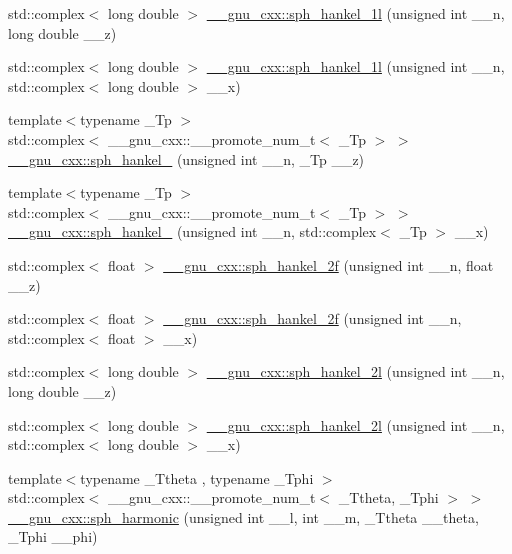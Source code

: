 \begin{DoxyCompactItemize}
\item 
std\+::complex$<$ long double $>$ \hyperlink{group__gnu__math__spec__func_ga6e77fd5cddfbd57d9120b20fc6c30e6f}{\+\_\+\+\_\+gnu\+\_\+cxx\+::sph\+\_\+hankel\+\_\+1l} (unsigned int \+\_\+\+\_\+n, long double \+\_\+\+\_\+z)
\item 
std\+::complex$<$ long double $>$ \hyperlink{group__gnu__math__spec__func_ga3e9d889d8f2e4792e892b12b1f5948b9}{\+\_\+\+\_\+gnu\+\_\+cxx\+::sph\+\_\+hankel\+\_\+1l} (unsigned int \+\_\+\+\_\+n, std\+::complex$<$ long double $>$ \+\_\+\+\_\+x)
\item 
{\footnotesize template$<$typename \+\_\+\+Tp $>$ }\\std\+::complex$<$ \+\_\+\+\_\+gnu\+\_\+cxx\+::\+\_\+\+\_\+promote\+\_\+num\+\_\+t$<$ \+\_\+\+Tp $>$ $>$ \hyperlink{group__gnu__math__spec__func_ga4f112ebd12bfbea7f0eea9275a1209ac}{\+\_\+\+\_\+gnu\+\_\+cxx\+::sph\+\_\+hankel\+\_} (unsigned int \+\_\+\+\_\+n, \+\_\+\+Tp \+\_\+\+\_\+z)
\item 
{\footnotesize template$<$typename \+\_\+\+Tp $>$ }\\std\+::complex$<$ \+\_\+\+\_\+gnu\+\_\+cxx\+::\+\_\+\+\_\+promote\+\_\+num\+\_\+t$<$ \+\_\+\+Tp $>$ $>$ \hyperlink{group__gnu__math__spec__func_ga54a1b7896a7218bfe0fb7f422af62122}{\+\_\+\+\_\+gnu\+\_\+cxx\+::sph\+\_\+hankel\+\_} (unsigned int \+\_\+\+\_\+n, std\+::complex$<$ \+\_\+\+Tp $>$ \+\_\+\+\_\+x)
\item 
std\+::complex$<$ float $>$ \hyperlink{group__gnu__math__spec__func_ga9496b81f94b8ba0162cf45df72be1e71}{\+\_\+\+\_\+gnu\+\_\+cxx\+::sph\+\_\+hankel\+\_\+2f} (unsigned int \+\_\+\+\_\+n, float \+\_\+\+\_\+z)
\item 
std\+::complex$<$ float $>$ \hyperlink{group__gnu__math__spec__func_ga4c3194b71831b265811f987cbbf6e031}{\+\_\+\+\_\+gnu\+\_\+cxx\+::sph\+\_\+hankel\+\_\+2f} (unsigned int \+\_\+\+\_\+n, std\+::complex$<$ float $>$ \+\_\+\+\_\+x)
\item 
std\+::complex$<$ long double $>$ \hyperlink{group__gnu__math__spec__func_ga6d3ead73a4f0bfeeb0aa1fd99daaf3b1}{\+\_\+\+\_\+gnu\+\_\+cxx\+::sph\+\_\+hankel\+\_\+2l} (unsigned int \+\_\+\+\_\+n, long double \+\_\+\+\_\+z)
\item 
std\+::complex$<$ long double $>$ \hyperlink{group__gnu__math__spec__func_ga3d9d9aaceba455a5ddc79d178ee1cb6d}{\+\_\+\+\_\+gnu\+\_\+cxx\+::sph\+\_\+hankel\+\_\+2l} (unsigned int \+\_\+\+\_\+n, std\+::complex$<$ long double $>$ \+\_\+\+\_\+x)
\item 
{\footnotesize template$<$typename \+\_\+\+Ttheta , typename \+\_\+\+Tphi $>$ }\\std\+::complex$<$ \+\_\+\+\_\+gnu\+\_\+cxx\+::\+\_\+\+\_\+promote\+\_\+num\+\_\+t$<$ \+\_\+\+Ttheta, \+\_\+\+Tphi $>$ $>$ \hyperlink{group__gnu__math__spec__func_ga28f1390a0366bc8c9780918d9720146b}{\+\_\+\+\_\+gnu\+\_\+cxx\+::sph\+\_\+harmonic} (unsigned int \+\_\+\+\_\+l, int \+\_\+\+\_\+m, \+\_\+\+Ttheta \+\_\+\+\_\+theta, \+\_\+\+Tphi \+\_\+\+\_\+phi)

\end{DoxyCompactItemize}
